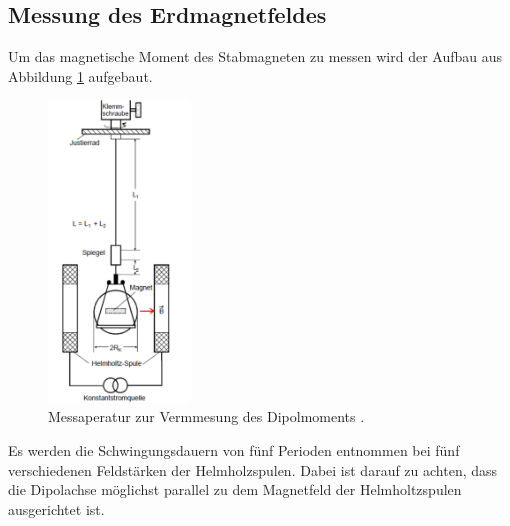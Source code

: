 \subsection{Messung des Erdmagnetfeldes}
Um das magnetische Moment des Stabmagneten zu messen wird der Aufbau aus Abbildung \ref{fig:Aufbau2} aufgebaut.
\begin{figure}
  \centering
  \includegraphics[height=8cm]{picture/Aufbau2.png}
  \caption{Messaperatur zur Vermmesung des Dipolmoments \cite{sample}.}
  \label{fig:Aufbau2}
\end{figure}
Es werden die Schwingungsdauern von fünf Perioden entnommen bei fünf verschiedenen Feldstärken der Helmholzspulen. Dabei ist darauf zu achten, dass die Dipolachse möglichst parallel zu dem Magnetfeld der Helmholtzspulen ausgerichtet ist.
